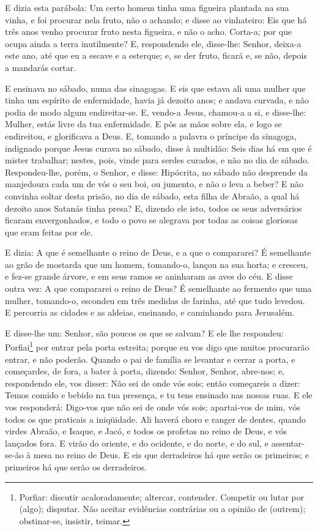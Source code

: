 E dizia esta parábola: Um certo homem tinha uma figueira plantada
na sua vinha, e foi procurar nela fruto, não o achando; e disse
ao vinhateiro: Eis que há três anos venho procurar fruto nesta
figueira, e não o acho. Corta-a; por que ocupa ainda a terra
inutilmente? E, respondendo ele, disse-lhe: Senhor, deixa-a este
ano, até que eu a escave e a esterque; e, se der fruto, ficará
e, se não, depois a mandarás cortar.

E ensinava no sábado, numa das sinagogas. E eis que estava
ali uma mulher que tinha um espírito de enfermidade, havia já
dezoito anos; e andava curvada, e não podia de modo algum
endireitar-se. E, vendo-a Jesus, chamou-a a si, e disse-lhe:
Mulher, estás livre da tua enfermidade. E pôs as mãos sobre
ela, e logo se endireitou, e glorificava a Deus. E, tomando a
palavra o príncipe da sinagoga, indignado porque Jesus curava no
sábado, disse à multidão: Seis dias há em que é mister trabalhar;
nestes, pois, vinde para serdes curados, e não no dia de sábado.
Respondeu-lhe, porém, o Senhor, e disse: Hipócrita, no sábado
não desprende da manjedoura cada um de vós o seu boi, ou jumento, e
não o leva a beber? E não convinha soltar desta prisão, no
dia de sábado, esta filha de Abraão, a qual há dezoito anos Satanás
tinha presa? E, dizendo ele isto, todos os seus adversários
ficaram envergonhados, e todo o povo se alegrava por todas as coisas
gloriosas que eram feitas por ele.

E dizia: A que é semelhante o reino de Deus, e a que o
compararei? É semelhante ao grão de mostarda que um homem,
tomando-o, lançou na sua horta; e cresceu, e fez-se grande árvore, e
em seus ramos se aninharam as aves do céu. E disse outra vez:
A que compararei o reino de Deus? É semelhante ao fermento
que uma mulher, tomando-o, escondeu em três medidas de farinha, até
que tudo levedou. E percorria as cidades e as aldeias,
ensinando, e caminhando para Jerusalém.

E disse-lhe um: Senhor, são poucos os que se salvam? E ele lhe
respondeu: Porfiai\footnote{Porfiar: discutir acaloradamente;
altercar, contender. Competir ou lutar por (algo); disputar. Não
aceitar evidências contrárias ou a opinião de (outrem); obstinar-se,
insistir, teimar.}
 por entrar pela porta estreita; porque eu vos
digo que muitos procurarão entrar, e não poderão. Quando o
pai de família se levantar e cerrar a porta, e começardes, de fora,
a bater à porta, dizendo: Senhor, Senhor, abre-nos; e, respondendo
ele, vos disser: Não sei de onde vós sois; então começareis a
dizer: Temos comido e bebido na tua presença, e tu tens ensinado nas
nossas ruas. E ele vos responderá: Digo-vos que não sei de
onde vós sois; apartai-vos de mim, vós todos os que praticais a
iniqüidade. Ali haverá choro e ranger de dentes, quando
virdes Abraão, e Isaque, e Jacó, e todos os profetas no reino de
Deus, e vós lançados fora. E virão do oriente, e do ocidente,
e do norte, e do sul, e assentar-se-ão à mesa no reino de Deus.
E eis que derradeiros há que serão os primeiros; e primeiros
há que serão os derradeiros.

